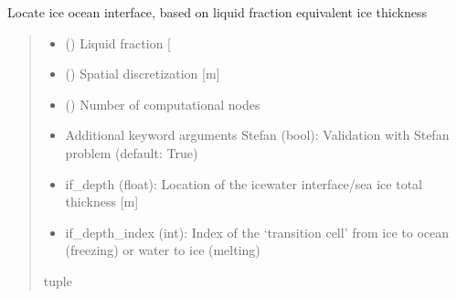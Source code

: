 \documentclass[a4paper,11pt,english,openany]{sphinxmanual}
\begin{document}
\begin{fulllineitems}
\label{\detokenize{api/spyice.models.sea_ice_model:spyice.models.sea_ice_model.locate_ice_ocean_interface}}
\pysigstartsignatures
{}
\pysigstopsignatures
\sphinxAtStartPar
Locate ice ocean interface, based on liquid fraction equivalent ice thickness
\begin{quote}\begin{description}
\begin{itemize}
\item {} 
\sphinxAtStartPar
{} () \textendash{} Liquid fraction {[}\sphinxhyphen{}{]}

\item {} 
\sphinxAtStartPar
{} () \textendash{} Spatial discretization {[}m{]}

\item {} 
\sphinxAtStartPar
{} () \textendash{} Number of computational nodes

\item {} 
\sphinxAtStartPar
{} \textendash{} Additional keyword arguments
Stefan (bool): Validation with Stefan problem (default: True)

\end{itemize}

\sphinxAtStartPar
\begin{description}
\begin{itemize}
\item {} 
\sphinxAtStartPar
if\_depth (float): Location of the ice\sphinxhyphen{}water interface/sea ice total thickness {[}m{]}

\item {} 
\sphinxAtStartPar
if\_depth\_index (int): Index of the ‘transition cell’ from ice to ocean (freezing) or water to ice (melting)

\end{itemize}

\end{description}


\sphinxAtStartPar
tuple

\end{description}\end{quote}

\end{fulllineitems}
\end{document}
